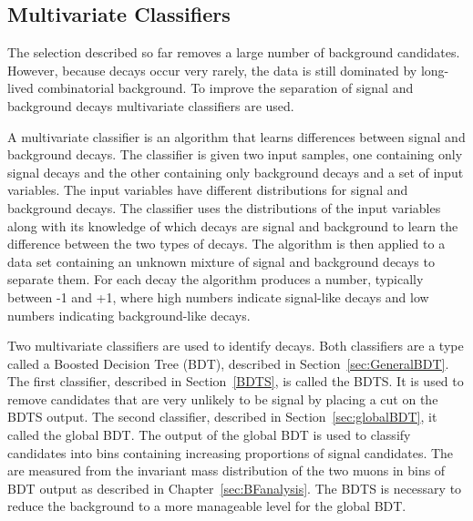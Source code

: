 \subsection{Multivariate Classifiers}
\label{sec:MVC}

The selection described so far removes a large number of background candidates. However, because \bmumu decays occur very rarely, the data is still dominated by long-lived combinatorial background. To improve the separation of signal and background decays multivariate classifiers are used.

A multivariate classifier is an algorithm that learns differences between signal and background decays. The classifier is given two input samples, one containing only signal decays and the other containing only background decays and a set of input variables. The input variables have different distributions for signal and background decays. The classifier uses the distributions of the input variables along with its knowledge of which decays are signal and background to learn the difference between the two types of decays. The algorithm is then applied to a data set containing an unknown mixture of signal and background decays to separate them. For each decay the algorithm produces a number, typically between -1 and +1, where high numbers indicate signal-like decays and low numbers indicating background-like decays. %

Two multivariate classifiers are used to identify \bsmumu decays. Both classifiers are a type called a Boosted Decision Tree (BDT), described in Section~\ref{sec:GeneralBDT}. %
The first classifier, described in Section~\ref{BDTS}, is called the BDTS. It is used to remove candidates that are very unlikely to be signal by placing a cut on the BDTS output. %
The second classifier, described in Section~\ref{sec:globalBDT}, it called the global BDT. The output of the global BDT is used to classify candidates into bins containing increasing proportions of signal candidates. The \BFs are measured from the invariant mass distribution of the two muons in bins of BDT output as described in Chapter~\ref{sec:BFanalysis}. %
The BDTS is necessary to reduce the background to a more manageable level for the global BDT.

